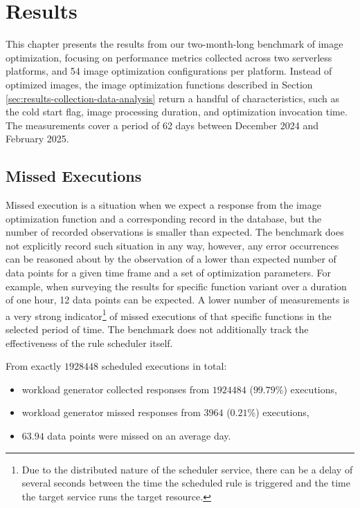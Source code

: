 \section{Results}
\label{cha:results}

This chapter presents the results from our two-month-long benchmark of image optimization, focusing on performance metrics collected across two serverless platforms, and 54 image optimization configurations per platform. Instead of optimized images, the image optimization functions described in Section \ref{sec:results-collection-data-analysis} return a handful of characteristics, such as the cold start flag, image processing duration, and optimization invocation time. The measurements cover a period of 62 days between December 2024 and February 2025.



\subsection{Missed Executions}
Missed execution is a situation when we expect a response from the image optimization function and a corresponding record in the database, but the number of recorded observations is smaller than expected. The benchmark does not explicitly record such situation in any way, however, any error occurrences can be reasoned about by the observation of a lower than expected number of data points for a given time frame and a set of optimization parameters. For example, when surveying the results for specific function variant over a duration of one hour, 12 data points can be expected. A lower number of measurements is a very strong indicator\footnote{Due to the distributed nature of the scheduler service, there can be a delay of several seconds between the time the scheduled rule is triggered and the time the target service runs the target resource.} of missed executions of that specific functions in the selected period of time. The benchmark does not additionally track the effectiveness of the rule scheduler itself.

From exactly $1928448$ scheduled executions in total:
\begin{itemize}
  \item workload generator collected responses from $1924484$ ($99.79\%$) executions,
  \item workload generator missed responses from $3964$ ($0.21\%$) executions,
  \item $63.94$ data points were missed on an average day. 
\end{itemize}

